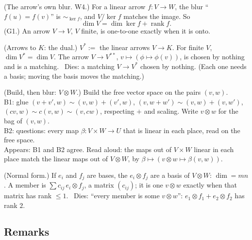 \begin{lines}
\item[\lab{T1}] (The arrow's own blur. W4.) For a linear arrow $f : V \to W$, the blur ``$f(u) = f(v)$'' is $\sim_{\ker f}$, and $V / \ker f$ matches the image. So \[ \dim V = \dim \ker f + \operatorname{rank} f . \] (G1.) An arrow $V \to V$, $V$ finite, is one-to-one exactly when it is onto.
\item[\lab{T2}] (Arrows to $K$: the dual.) $V^* :=$ the linear arrows $V \to K$. For finite $V$, $\dim V^* = \dim V$. The arrow $V \to V^{**}$, $v \mapsto (\phi \mapsto \phi(v))$, is chosen by nothing and is a matching. \ Dies: a matching $V \to V^*$ chosen by nothing. (Each one needs a basis; moving the basis moves the matching.)
\item[\lab{T3}] (Build, then blur: $V \otimes W$.) Build the free vector space on the pairs $(v, w)$. \\
B1: glue $(v + v', w) \sim (v, w) + (v', w)$, $(v, w + w') \sim (v, w) + (v, w')$, $(cv, w) \sim c(v, w) \sim (v, cw)$, respecting $+$ and scaling. Write $v \otimes w$ for the bag of $(v, w)$. \\
B2: questions: every map $\beta : V \times W \to U$ that is linear in each place, read on the free space. \\
Appears: B1 and B2 agree. Read aloud: the maps out of $V \times W$ linear in each place match the linear maps out of $V \otimes W$, by $\beta \mapsto (v \otimes w \mapsto \beta(v, w))$.
\item[\lab{T4}] (Normal form.) If $e_i$ and $f_j$ are bases, the $e_i \otimes f_j$ are a basis of $V \otimes W$: $\dim = mn$. A member is $\sum c_{ij}\, e_i \otimes f_j$, a matrix $(c_{ij})$; it is one $v \otimes w$ exactly when that matrix has rank $\le 1$. \ Dies: ``every member is some $v \otimes w$'': $e_1 \otimes f_1 + e_2 \otimes f_2$ has rank $2$.
\end{lines}

\subsection*{Remarks}

